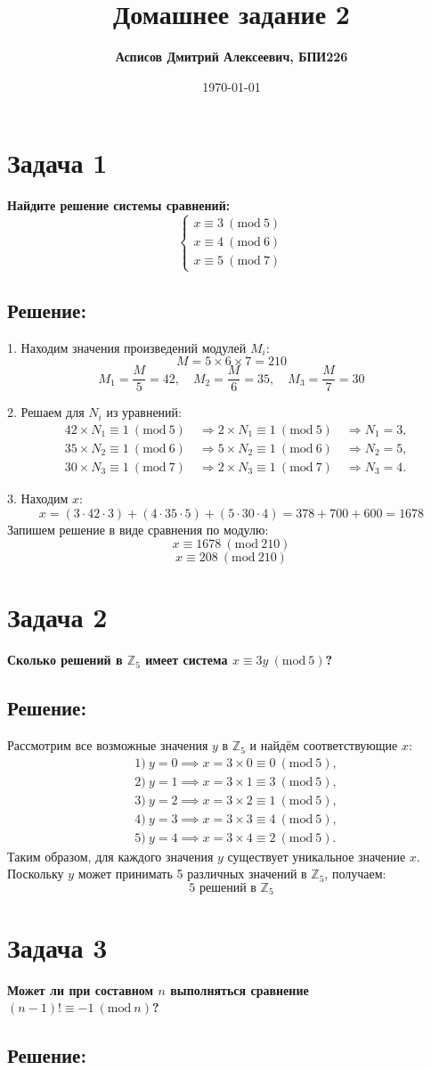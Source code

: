 \documentclass[12pt,a4paper]{article}
\author{\textbf{Асписов Дмитрий Алексеевич, БПИ226}}
\date{\today}
\title{\textbf{Домашнее задание 2}}
\newcommand{\zadacha}[2]{\section*{Задача #1} \textcolor{myblue}{\textbf{#2}}}
\begin{document}
\maketitle

\zadacha{1}{Найдите решение системы сравнений:}
\[
\begin{cases}
x \equiv 3 \ (\text{mod} \ 5) \\
x \equiv 4 \ (\text{mod} \ 6) \\
x \equiv 5 \ (\text{mod} \ 7)
\end{cases}
\]

\subsection*{Решение:}

1. Находим значения произведений модулей \(M_i\):
\[
M = 5 \times 6 \times 7 = 210
\]
\[
M_1 = \frac{M}{5} = 42, \quad M_2 = \frac{M}{6} = 35, \quad M_3 = \frac{M}{7} = 30
\]

2. Решаем для \(N_i\) из уравнений:
\[
\begin{aligned}
&42 \times N_1 \equiv 1\ (\text{mod} \ 5) \quad \Rightarrow 2 \times N_1 \equiv 1\ (\text{mod} \ 5) \quad \Rightarrow N_1 = 3, \\
&35 \times N_2 \equiv 1\ (\text{mod} \ 6) \quad \Rightarrow 5 \times N_2 \equiv 1\ (\text{mod} \ 6) \quad \Rightarrow N_2 = 5, \\
&30 \times N_3 \equiv 1\ (\text{mod} \ 7) \quad \Rightarrow 2 \times N_3 \equiv 1\ (\text{mod} \ 7) \quad \Rightarrow N_3 = 4.
\end{aligned}
\]

3. Находим \(x\):
\[
x = (3 \cdot 42 \cdot 3) + (4 \cdot 35 \cdot 5) + (5 \cdot 30 \cdot 4) = 378 + 700 + 600 = 1678
\]
Запишем решение в виде сравнения по модулю:
\[
x \equiv 1678 \ (\text{mod} \ 210)
\]
\[
\boxed{x \equiv 208\ (\text{mod}\ 210)}
\]

\zadacha{2}{Сколько решений в \(\mathbb{Z}_5\) имеет система \(x \equiv 3y \ (\text{mod} \ 5)\)?}

\subsection*{Решение:}

Рассмотрим все возможные значения \(y\) в \(\mathbb{Z}_5\) и найдём соответствующие \(x\):
\[
\begin{aligned}
&1)\ y = 0 \implies x = 3 \times 0 \equiv 0 \ (\text{mod} \ 5), \\
&2)\ y = 1 \implies x = 3 \times 1 \equiv 3 \ (\text{mod} \ 5), \\
&3)\ y = 2 \implies x = 3 \times 2 \equiv 1 \ (\text{mod} \ 5), \\
&4)\ y = 3 \implies x = 3 \times 3 \equiv 4 \ (\text{mod} \ 5), \\
&5)\ y = 4 \implies x = 3 \times 4 \equiv 2 \ (\text{mod} \ 5).
\end{aligned}
\]
Таким образом, для каждого значения \(y\) существует уникальное значение \(x\). Поскольку \(y\) может принимать 5 различных значений в \(\mathbb{Z}_5\), получаем:
\[
\boxed{5 \text{ решений в } \mathbb{Z}_5}
\]

\zadacha{3}{Может ли при составном \(n\) выполняться сравнение \((n-1)! \equiv -1 \ (\text{mod} \ n)\)?}

\subsection*{Решение:}
\end{document}
